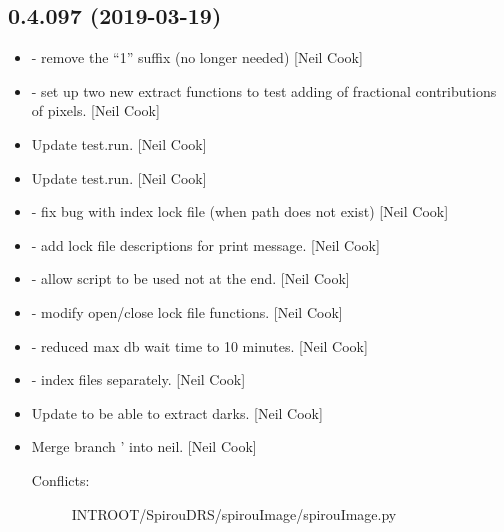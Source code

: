 \documentclass[a4paper,10pt,english]{report}
\begin{document}
\subsection{0.4.097 (2019-03-19)}
\label{\detokenize{misc/changelog:id163}}\begin{itemize}
\item {} 
 - remove the “1” suffix (no longer needed) {[}Neil
Cook{]}

\item {} 
 - set up two new extract functions to test adding of
fractional contributions of pixels. {[}Neil Cook{]}

\item {} 
Update test.run. {[}Neil Cook{]}

\item {} 
Update test.run. {[}Neil Cook{]}

\item {} 
 - fix bug with index lock file (when path does not
exist) {[}Neil Cook{]}

\item {} 
 - add lock file descriptions for print message. {[}Neil
Cook{]}

\item {} 
 - allow  script to be used not at the end.
{[}Neil Cook{]}

\item {} 
 - modify open/close lock file functions. {[}Neil Cook{]}

\item {} 
 - reduced max db wait time to 10 minutes.
{[}Neil Cook{]}

\item {} 
 - index files separately. {[}Neil Cook{]}

\item {} 
Update  to be able to extract darks. {[}Neil Cook{]}

\item {} 
Merge branch ’ into neil. {[}Neil Cook{]}
\begin{description}
\item[{Conflicts:}] \leavevmode
INTROOT/SpirouDRS/spirouImage/spirouImage.py


\end{description}
\end{itemize}
\end{document}
